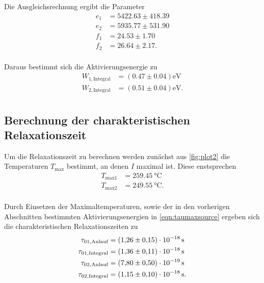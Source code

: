 Die Ausgleichsrechnung ergibt die Parameter
\begin{align*}
  e_1 &= 5422.63 \pm 418.39 \\
  e_2 &= 5935.77 \pm 531.90 \\
  f_1 &= 24.53 \pm 1.70 \\
  f_2 &= 26.64 \pm 2.17. \\
\end{align*}

Daraus bestimmt sich die Aktivierungsenergie zu 
\begin{align*}
  W_{1,\text{Integral}} &= (0.47 \pm 0.04) \unit{\electronvolt}\\
  W_{2,\text{Integral}} &= (0.51 \pm 0.04)\unit{\electronvolt}.\\
\end{align*} 


\subsection{Berechnung der charakteristischen Relaxationszeit}

Um die Relaxationszeit zu berechnen werden zunächst aus \autoref{fig:plot2} die Temperaturen $T_\text{max}$ bestimmt, an denen $I$ maximal ist.
Diese enstsprechen
\begin{align*}
  T_\text{max1} &= \qty{259.45}{\celsius}\\
  T_\text{max2} &= \qty{249.55}{\celsius}.\\
\end{align*}

Durch Einsetzen der Maximaltemperaturen, sowie der in den vorherigen Abschnitten bestimmten Aktivierungsenergien
in \autoref{eqn:taumaxsource} ergeben sich die charakteristischen Relaxationszeiten zu
\begin{align*}
  \tau_{01,\text{Anlauf}} &= \qty{1.26 (15)e-18}{\second}\\ 
  \tau_{01,\text{Integral}} &=\qty{1.36 (11)e-18}{\second}\\
  \tau_{02,\text{Anlauf}} &= \qty{7.80 (50)e-19}{\second}\\
  \tau_{02,\text{Integral}} &=\qty{1.15 (0.10)e-18}{\second}.\\
\end{align*}
